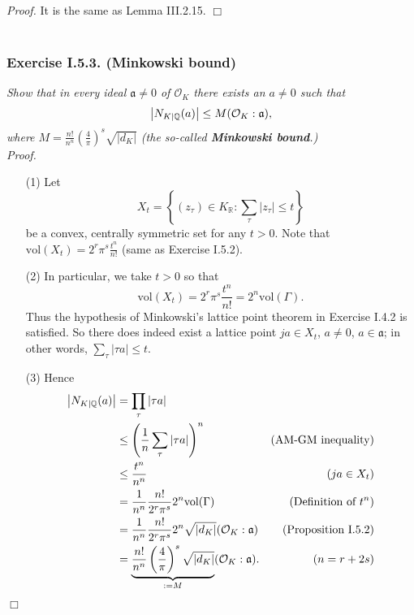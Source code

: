 \documentclass{article}
\begin{document}
\emph{Proof.}
  It is the same as Lemma III.2.15.
$\Box$ \\\\









\subsubsection*{Exercise I.5.3. (Minkowski bound)}
\emph{Show that in every ideal $\mathfrak{a} \neq 0$ of $\mathcal{O}_K$
there exists an $a \neq 0$ such that
\[
  \abs{ N_{K|\mathbb{Q}}(a) } \leq M (\mathcal{O}_K : \mathfrak{a}),
\]
where $M = \frac{n!}{n^n} \left( \frac{4}{\pi} \right)^{s} \sqrt{|d_K|}$
(the so-called \textbf{Minkowski bound}.)} \\



\emph{Proof.}
\begin{enumerate}
\item[(1)]
  Let
  \[
    X_t = \left\{ (z_\tau) \in K_{\mathbb{R}} : \sum_{\tau}|z_\tau| \leq t \right\}
  \]
  be a convex, centrally symmetric set for any $t > 0$.
  Note that $\mathrm{vol}(X_t) = 2^r \pi^s \frac{t^n}{n!}$ (same as Exercise I.5.2).

\item[(2)]
  In particular, we take $t > 0$ so that
  \[
    \mathrm{vol}(X_t)
    = 2^r \pi^s \frac{t^n}{n!}
    = 2^n \mathrm{vol}(\Gamma).
  \]
  Thus the hypothesis of Minkowski's lattice point theorem in Exercise I.4.2
  is satisfied.
  So there does indeed exist a lattice point $ja \in X_t$, $a \neq 0$, $a \in \mathfrak{a}$;
  in other words, $\sum_\tau |\tau a| \leq t$.

\item[(3)]
  Hence
  \begin{align*}
    \abs{ N_{K|\mathbb{Q}}(a) }
    &= \prod_{\tau} |\tau a| \\
    &\leq \left( \frac{1}{n} \sum_{\tau}|\tau a| \right)^n
      &(\text{AM-GM inequality}) \\
    &\leq \frac{t^n}{n^n}
      &(ja \in X_t) \\
    &= \frac{1}{n^n} \frac{n!}{2^r \pi^s} 2^n \mathrm{vol}(\Gamma)
      &(\text{Definition of $t^n$}) \\
    &= \frac{1}{n^n} \frac{n!}{2^r \pi^s} 2^n \sqrt{|d_K|} (\mathcal{O}_K : \mathfrak{a})
      &(\text{Proposition I.5.2}) \\
    &= \underbrace{\frac{n!}{n^n} \left( \frac{4}{\pi} \right)^{s} \sqrt{|d_K|}}_{:= M}
      (\mathcal{O}_K : \mathfrak{a}).
      &(n = r + 2s)
  \end{align*}
\end{enumerate}
$\Box$ \\\\
\end{document}
